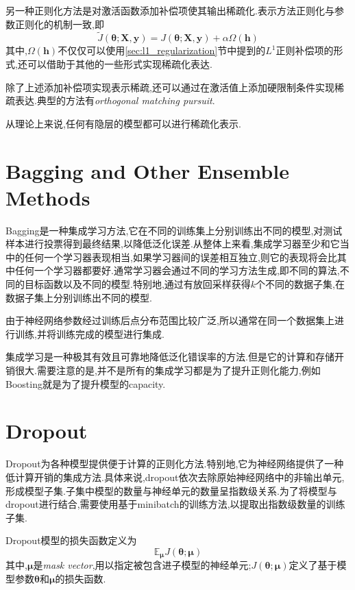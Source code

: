 另一种正则化方法是对激活函数添加补偿项使其输出稀疏化.表示方法正则化与参数正则化的机制一致,即
\begin{equation}
\tilde J({\bm\theta};\bm{X,y})=J({\bm\theta};\bm{X,y})+\alpha\Omega(\bm h)
\end{equation}
其中,$\Omega(\bm h)$不仅仅可以使用\ref{sec:l1_regularization}节中提到的$L^1$正则补偿项的形式,还可以借助于其他的一些形式实现稀疏化表达.

除了上述添加补偿项实现表示稀疏,还可以通过在激活值上添加硬限制条件实现稀疏表达.典型的方法有\textit{orthogonal matching pursuit}.

从理论上来说,任何有隐层的模型都可以进行稀疏化表示.

\section{Bagging and Other Ensemble Methods}

Bagging是一种集成学习方法,它在不同的训练集上分别训练出不同的模型,对测试样本进行投票得到最终结果,以降低泛化误差.从整体上来看,集成学习器至少和它当中的任何一个学习器表现相当,如果学习器间的误差相互独立,则它的表现将会比其中任何一个学习器都要好.通常学习器会通过不同的学习方法生成,即不同的算法,不同的目标函数以及不同的模型.特别地,通过有放回采样获得$k$个不同的数据子集,在数据子集上分别训练出不同的模型.

由于神经网络参数经过训练后点分布范围比较广泛,所以通常在同一个数据集上进行训练,并将训练完成的模型进行集成.

集成学习是一种极其有效且可靠地降低泛化错误率的方法.但是它的计算和存储开销很大.需要注意的是,并不是所有的集成学习都是为了提升正则化能力,例如Boosting就是为了提升模型的capacity.

\section{Dropout}

Dropout为各种模型提供便于计算的正则化方法.特别地,它为神经网络提供了一种低计算开销的集成方法.具体来说,dropout依次去除原始神经网络中的非输出单元,形成模型子集.子集中模型的数量与神经单元的数量呈指数级关系.为了将模型与dropout进行结合,需要使用基于minibatch的训练方法,以提取出指数级数量的训练子集.

Dropout模型的损失函数定义为
\begin{equation}
\mathbb E_{\bm\mu}J({\bm\theta};\bm\mu)
\end{equation}
其中,$\bm\mu$是\textit{mask vector},用以指定被包含进子模型的神经单元;$J({\bm\theta};\bm\mu)$定义了基于模型参数${\bm\theta}$和$\bm\mu$的损失函数.

